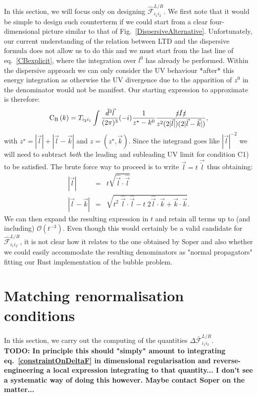 \documentclass[11pt]{article}
\begin{document}
In this section, we will focus only on designing $\mathcal{\hat{F}}^{L/R}_{i_1i_2}$.
We first note that it would be simple to design such counterterm if we could start from a clear four-dimensional picture similar to that of Fig.~\ref{DispersiveAlternative}.
Unfortunately, our current understanding of the relation between LTD and the dispersive formula does not allow us to do this and we must start from the last line of eq.~\ref{CBexplicit}, where the integration over $l^0$ has already be performed.
Within the dispersive approach we can only consider the UV behaviour *after* this energy integration as otherwise the UV divergence due to the apparition of $z^0$ in the denominator would not be manifest.
Our starting expression to approximate is therefore:
\begin{equation}
\textrm{C}_\textrm{B}\left(k \right) =
T_{i_2 i_1}  \int \frac{\tilde{d}^3 \vec{l}}{(2\pi)^3} (-i) \frac{1}{z^\star-k^0} \frac{\slashed{z}\slashed{l}\slashed{z}}{z^2 (2 |\vec{l}|) (2 |\vec{l}-\vec{k}|)},
\end{equation}
with $z^\star = |\vec{l}|+|\vec{l}-\vec{k}|$ and $z=(z^\star,\vec{k})$. Since the integrand goes like $|\vec{l}|^{-2}$ we will need to subtract \emph{both} the leading and subleading UV limit for condition C1) to be satisfied.
The brute force way to proceed is to write $\vec{l}=t\;\vec{\hat{l}}$ thus obtaining:
\begin{eqnarray}
 |\vec{l}|&=&t\sqrt{\hat{\vec{l}} \cdot  \hat{\vec{l}}} \\
 |\vec{l}-\vec{k}|&=&\sqrt{t^2\; \hat{\vec{l}} \cdot  \hat{\vec{l}}-t\; 2\hat{\vec{l}} \cdot \vec{k} + \vec{k} \cdot \vec{k}}.
 \end{eqnarray}
We can then expand the resulting expression in $t$ and retain all terms up to (and including) $\mathcal{O}(t^{-3})$.
Even though this would certainly be a valid candidate for $\mathcal{\hat{F}}^{L/R}_{i_1i_2}$, it is not clear how it relates to the one obtained by Soper and also whether we could easily accommodate the resulting denominators as "normal propagators" fitting our Rust implementation of the bubble problem.

\section{Matching renormalisation conditions}
In this section, we carry out the computing of the quantities $\Delta \mathcal{\bar{F}}^{L/R}_{i_1i_2}$.\\

{\bf{TODO: In principle this should "simply" amount to integrating eq.~\ref{constraintOnDeltaF} in dimensional regularisation and reverse-engineering a local expression integrating to that quantity... I don't see a systematic way of doing this however. Maybe contact Soper on the matter...}}



\end{document}

